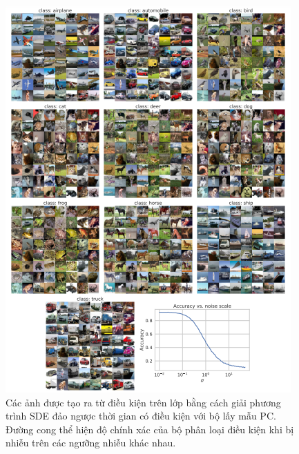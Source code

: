 \documentclass{article} %
\begin{document}
\begin{figure}[h!]
    \centering
    \includegraphics[height=0.8\textheight]{figures/13.png}
    \caption{Các ảnh được tạo ra từ điều kiện trên lớp bằng cách giải phương trình SDE đảo ngược thời gian có điều kiện với bộ lấy mẫu PC.
    Đường cong thể hiện độ chính xác của bộ phân loại điều kiện khi bị nhiễu trên các ngưỡng nhiễu khác nhau.}
    \label{fig:13}
\end{figure}
\end{document}
